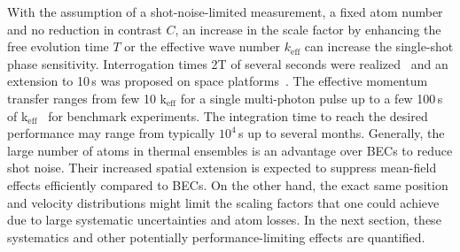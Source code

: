 With the assumption of a shot-noise-limited measurement, a fixed atom number and no reduction in contrast $C$, an increase in the scale factor by enhancing the free evolution time $T$ or the effective wave number $k_\text{eff}$ can increase the single-shot phase sensitivity.
Interrogation times 2T of several seconds were realized~\cite{Dickerson2013} and an extension to 10\,s was proposed on space platforms~\cite{Aguilera2014}. The effective momentum transfer ranges from few 10 k$_\text{eff}$ for a single multi-photon pulse up to a few 100\,s of k$_\text{eff}$~\cite{Gebbe2019arxiv} for benchmark experiments.
The integration time to reach the desired performance may range from typically $10^4$\,s up to several months.
Generally, the large number of atoms in thermal ensembles is an advantage over BECs to reduce shot noise. Their increased spatial extension is expected to suppress mean-field effects efficiently compared to BECs. On the other hand, the exact same position and velocity distributions might limit the scaling factors that one could achieve due to large systematic uncertainties and atom losses. In the next section, these systematics and other potentially performance-limiting effects are quantified.
%